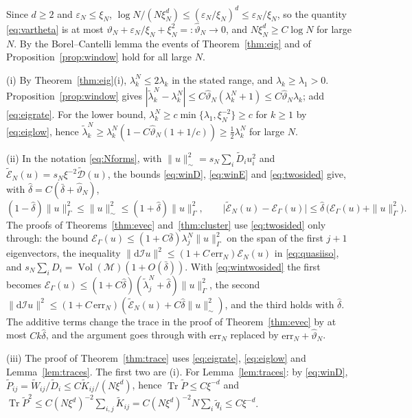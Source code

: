 \documentclass[11pt,a4paper]{article}
\makeatletter
\theoremstyle{stmt}
\theoremstyle{defn}
\theoremstyle{rmk}
\renewenvironment{proof}[1][\proofname]{\par\pushQED{\qed}\normalfont\topsep6\p@\@plus6\p@\relax
  \trivlist\item[\hskip\labelsep{\sffamily\itshape\small #1.}]\ignorespaces}{\popQED\endtrivlist\@endpefalse}
\numberwithin{equation}{section}
\DeclareMathOperator{\Tr}{Tr}
\DeclareMathOperator{\Vol}{Vol}
\newcommand{\M}{\mathcal{M}}
\newcommand{\dd}{\mathrm{d}}
\makeatother
\begin{document}
\begin{proof}[Proof of Theorem~\ref{thm:window}]
Since $d\ge2$ and $\varepsilon_N\le\xi_N$, $\log N/(N\xi_N^d)\le(\varepsilon_N/\xi_N)^d\le\varepsilon_N/\xi_N$, so the quantity \eqref{eq:vartheta} is at most $\vartheta_N+\varepsilon_N/\xi_N+\xi_N^2=:\hat\vartheta_N\to0$, and $N\xi_N^d\ge C\log N$ for large $N$. By the Borel--Cantelli lemma the events of Theorem~\ref{thm:eig} and of Proposition~\ref{prop:window} hold for all large $N$.

(i) By Theorem~\ref{thm:eig}(i), $\lambda^N_k\le2\lambda_k$ in the stated range, and $\lambda_k\ge\lambda_1>0$. Proposition~\ref{prop:window} gives $|\tilde\lambda^N_k-\lambda^N_k|\le C\hat\vartheta_N(\lambda^N_k+1)\le C\hat\vartheta_N\lambda_k$; add \eqref{eq:eigrate}. For the lower bound, $\lambda^N_k\ge c\min\{\lambda_1,\xi_N^{-2}\}\ge c$ for $k\ge1$ by \eqref{eq:eiglow}, hence $\tilde\lambda^N_k\ge\lambda^N_k(1-C\hat\vartheta_N(1+1/c))\ge\tfrac12\lambda^N_k$ for large $N$.

(ii) In the notation \eqref{eq:Nforms}, with $\|u\|_\sim^2=s_N\sum_i\tilde D_iu_i^2$ and $\tilde{\mathcal E}_N(u)=s_N\xi^{-2}\tilde{\mathcal D}(u)$, the bounds \eqref{eq:winD}, \eqref{eq:winE} and \eqref{eq:twosided} give, with $\hat\delta=C(\bar\delta+\hat\vartheta_N)$,
\begin{equation}\label{eq:wintwosided}
(1-\hat\delta)\|u\|_\Gamma^2\le\|u\|_\sim^2\le(1+\hat\delta)\|u\|_\Gamma^2,\qquad\big|\tilde{\mathcal E}_N(u)-\mathcal E_\Gamma(u)\big|\le\hat\delta\,\big(\mathcal E_\Gamma(u)+\|u\|_\Gamma^2\big).
\end{equation}
The proofs of Theorems~\ref{thm:evec} and~\ref{thm:cluster} use \eqref{eq:twosided} only through: the bound $\mathcal E_\Gamma(u)\le(1+C\bar\delta)\lambda^N_j\|u\|_\Gamma^2$ on the span of the first $j+1$ eigenvectors, the inequality $\|\dd\mathcal Iu\|^2\le(1+C\,\mathrm{err}_N)\mathcal E_N(u)$ in \eqref{eq:quasiiso}, and $s_N\sum_iD_i=\Vol(\M)(1+O(\bar\delta))$. With \eqref{eq:wintwosided} the first becomes $\mathcal E_\Gamma(u)\le(1+C\hat\delta)(\tilde\lambda^N_j+\hat\delta)\|u\|_\Gamma^2$, the second $\|\dd\mathcal Iu\|^2\le(1+C\,\mathrm{err}_N)(\tilde{\mathcal E}_N(u)+C\hat\delta\|u\|_\sim^2)$, and the third holds with $\hat\delta$. The additive terms change the trace in the proof of Theorem~\ref{thm:evec} by at most $Ck\hat\delta$, and the argument goes through with $\mathrm{err}_N$ replaced by $\mathrm{err}_N+\hat\vartheta_N$.

(iii) The proof of Theorem~\ref{thm:trace} uses \eqref{eq:eigrate}, \eqref{eq:eiglow} and Lemma~\ref{lem:traces}. The first two are (i). For Lemma~\ref{lem:traces}: by \eqref{eq:winD}, $\tilde P_{ij}=\tilde W_{ij}/\tilde D_i\le C\tilde K_{ij}/(N\xi^d)$, hence $\Tr\tilde P\le C\xi^{-d}$ and $\Tr\tilde P^2\le C(N\xi^d)^{-2}\sum_{i,j}\tilde K_{ij}=C(N\xi^d)^{-2}N\sum_i\tilde q_i\le C\xi^{-d}$.
\end{proof}
\end{document}

